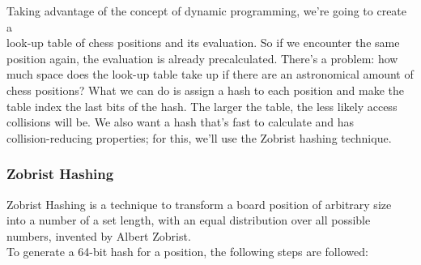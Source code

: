 Taking advantage of the concept of dynamic programming, we're going to create a\\
look-up table of chess positions and its evaluation. So if we encounter the same\\
position again, the evaluation is already precalculated. There's a problem: how\\
much space does the look-up table take up if there are an astronomical amount
of chess positions? What we can do is assign a hash to each position and make the\\
table index the last bits of the hash. The larger the table, the less likely access\\
collisions will be. We also want a hash that's fast to calculate and has\\
collision-reducing properties; for this, we'll use the Zobrist hashing technique.\\

\subsubsection{Zobrist Hashing}

Zobrist Hashing is a technique to transform a board position of arbitrary size\\
into a number of a set length, with an equal distribution over all possible\\
numbers, invented by Albert Zobrist.\\

To generate a 64-bit hash for a position, the following steps are followed:\\

